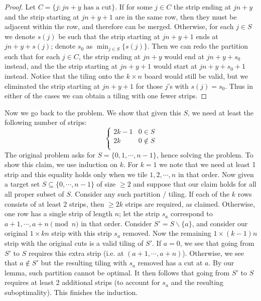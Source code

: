 \documentclass[11pt,a4paper]{article}
\begin{document}
\begin{enumerate}
\begin{proof}
    		Let $C = \{j: jn + y\text{ has a cut}\}$. 
    		If for some $j\in C$ the strip ending at $jn + y$ and the strip starting at $jn + y + 1$ are in the same row, 
    		then they must be adjacent within the row, 
    		and therefore can be merged. 
    		Otherwise, for each $j\in S$ we denote $s(j)$ be such that the strip starting at $jn + y + 1$ ends at $jn + y + s(j)$; 
    		denote $s_0$ as $\min_{j\in S} \{s(j)\}$. 
    		Then we can redo the partition such that 
    		for each $j\in C$, 
    		the strip ending at $jn + y$ would end at $jn + y + s_0$ instead, 
    		and the the strip starting at $jn + y + 1$ would start at $jn + y + s_0 + 1$ instead. 
    		Notice that the tiling onto the $k\times n$ board would still be valid, 
    		but we eliminated the strip starting at $jn + y + 1$ for those $j$'s with $s(j) = s_0$. 
    		Thus in either of the cases we can obtain a tiling with one fewer strips. 
    	\end{proof}
    	
    	Now we go back to the problem. We show that given this $S$, 
    	we need at least the following number of strips: 
    	\[
    	\begin{cases}
    		2k - 1 & 0\in S\\
    		2k & 0\not\in S\\
    	\end{cases}
    	\]
    	The original problem asks for $S = \{0, 1, \cdots, n - 1\}$, hence solving the problem. 
    	To show this claim, we use induction on $k$. 
    	For $k = 1$ we note that we need at least 1 strip and this equality holds only when we tile $1, 2, \cdots, n$ in that order. 
    	Now given a target set $S\subseteq \{0, \cdots, n - 1\}$ of size $\ge 2$ and suppose that our claim holds for all all proper subset of $S$. 
    	Consider any such partition / tiling. 
    	If each of the $k$ rows consists of at least 2 strips, 
    	then $\ge 2k$ strips are required, as claimed. 
    	Otherwise, one row has a single strip of length $n$; 
    	let the strip $s_a$ correspond to $a + 1, \cdots, a + n\pmod{n}$ in that order. 
    	Consider $S' = S\backslash \{a\}$, 
    	and consider our original $1 \times kn$ strip with this strip $s_a$ removed. 
    	Now the remaining $1\times (k - 1)n$ strip with the original cuts is a valid tiling of $S'$. 
    	If $a = 0$, we see that going from $S'$ to $S$ requires this extra strip 
    	(i.e. at $(a+1, \cdots, a+n)$). 
    	Otherwise, we see that $a\not\in S'$ but the resulting tiling with $s_a$ removed has a cut at $a$. 
    	By our lemma, such partition cannot be optimal. 
    	It then follows that going from $S'$ to $S$ requires at least 2 additional strips 
    	(to account for $s_a$ and the resulting suboptimality). 
    	This finishes the induction. 
    \end{enumerate}
    
\end{document}

